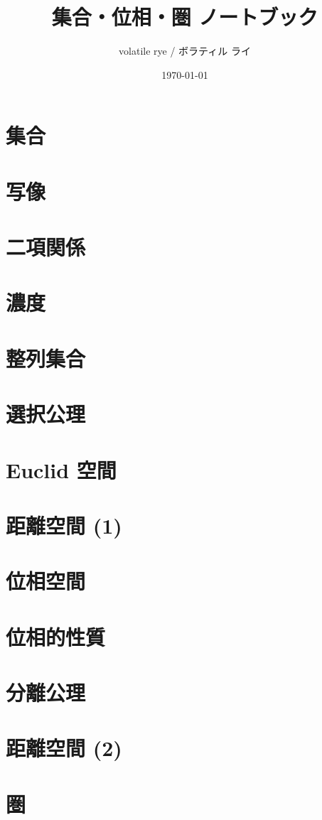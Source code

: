 \title{集合・位相・圏 ノートブック}
\author{volatile rye / ボラティル ライ}
\date{\today}


\maketitle
\tableofcontents

\chapter{集合}


\chapter{写像}

\chapter{二項関係}

\chapter{濃度}

\chapter{整列集合}

\chapter{選択公理}

\chapter{Euclid 空間}

\chapter{距離空間 (1)}

\chapter{位相空間}



\chapter{位相的性質}

\chapter{分離公理}

\chapter{距離空間 (2)}

\chapter{圏}

\printindex
